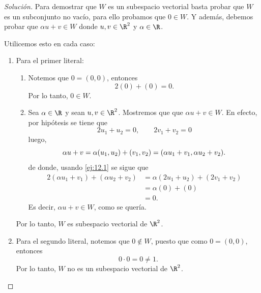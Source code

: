 \documentclass[a4,11pt]{aleph-notas}
\begin{document}
\begin{proof}[Solución]\hspace{0pt}
    Para demostrar que $W$ es un subespacio vectorial basta probar que $W$ es un subconjunto no vacío, para ello probamos que $0\in W$. Y además, debemos probar que $\alpha u +v\in W$ donde $u,v \in\R^2$ y $\alpha \in\R$.

    Utilicemos esto en cada caso:
    \begin{enumerate}
        \item 
        Para el primer literal:
        \begin{enumerate}
            \item Notemos que $0 = (0,0)$, entonces
                \[
                    2 (0) + (0) = 0.
                \]
                Por lo tanto, $0\in W$.
            \item Sea $\alpha \in \R$ y sean $u,v\in\R^2$. Mostremos que que $\alpha u + v \in W$. En efecto, por hipótesis se tiene que
                \begin{equation}\label{ej:12.1}
                    2 u_1 + u_2 = 0, \qquad 2 v_1 + v_2 = 0
                \end{equation}
                luego,
                \[
                    \alpha u + v  = \alpha (u_1,u_2) + (v_1,v_2) \\
                     = (\alpha u_1 + v_1, \alpha u_2 + v_2).
                \]
                de donde, usando \eqref{ej:12.1} se sigue que 
                \begin{align*}
                    2(\alpha u_1 + v_1) + (\alpha u_2 + v_2) 
                    &= \alpha( 2 u_1 + u_2) + (2 v_1 + v_2) \\
                    &= \alpha( 0 ) + ( 0 ) \\
                    &= 0.
                \end{align*}
                Es decir, $\alpha u + v\in W$, como se quería.
        \end{enumerate}
        Por lo tanto, $W$ es subespacio vectorial de $\R^2$. 
    \item 
        Para el segundo literal, notemos que 
        $0 \notin W$,  puesto que como $0 = (0,0)$, entonces
        \[
            0\cdot 0 = 0 \neq 1.
        \]
        Por lo tanto, $W$ no es un subespacio vectorial de $\R^2$. \qedhere
    \end{enumerate}
\end{proof}
\end{document}
